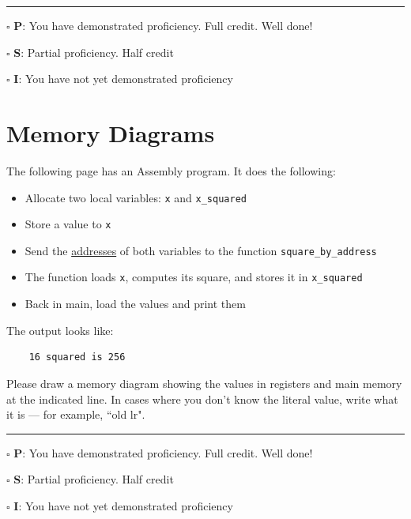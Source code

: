 \documentclass[12pt]{article}
\begin{document}
\vfill

\rule[1ex]{\textwidth}{.1pt}

$\square$ \textbf{P}: You have demonstrated proficiency. Full credit. Well done!

$\square$ \textbf{S}: Partial proficiency. Half credit

$\square$ \textbf{I}: You have not yet demonstrated proficiency

\newpage



\section*{Memory Diagrams}

The following page has an Assembly program. It does the following:
\begin{itemize}
    \item Allocate two local variables: \texttt{x} and \texttt{x\_squared}
    \item Store a value to \texttt{x}
    \item Send the \underline{addresses} of both variables to the function \texttt{square\_by\_address}
    \item The function loads \texttt{x}, computes its square, and stores it in \texttt{x\_squared}
    \item Back in main, load the values and print them
\end{itemize}

The output looks like:
\begin{verbatim}
    16 squared is 256
\end{verbatim}

Please draw a memory diagram showing the values in registers and main memory at the indicated line. In cases where you don't know the literal value, write what it is --- for example, ``old lr". 


\vfill

\rule[1ex]{\textwidth}{.1pt}

$\square$ \textbf{P}: You have demonstrated proficiency. Full credit. Well done!

$\square$ \textbf{S}: Partial proficiency. Half credit

$\square$ \textbf{I}: You have not yet demonstrated proficiency

\newpage
\end{document}
